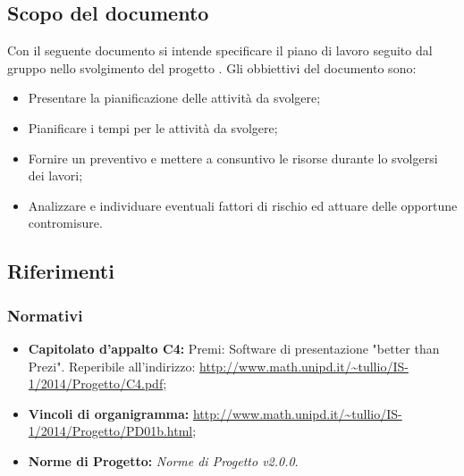 \subsection{Scopo del documento}
Con il seguente documento si intende specificare il piano di lavoro seguito dal gruppo \GRUPPO{} nello svolgimento del progetto \PROGETTO{}.
Gli obbiettivi del documento sono:
\begin{itemize}
	\item Presentare la pianificazione delle attività da svolgere;
	\item Pianificare i tempi per le attività da svolgere;
	\item Fornire un preventivo e mettere a consuntivo le risorse durante lo svolgersi dei lavori;
	\item Analizzare e individuare eventuali fattori di rischio ed attuare delle opportune contromisure.
\end{itemize}

\subsection{Riferimenti}
\subsubsection{Normativi}
\begin{itemize}
	\item \textbf{Capitolato d'appalto C4:} Premi: Software di presentazione "better than Prezi". Reperibile all'indirizzo: \url{http://www.math.unipd.it/~tullio/IS-1/2014/Progetto/C4.pdf};
	\item \textbf{Vincoli di organigramma:} \url{http://www.math.unipd.it/~tullio/IS-1/2014/Progetto/PD01b.html}; 
	\item \textbf{Norme di Progetto:} \textit{Norme di Progetto v2.0.0}.
\end{itemize}
